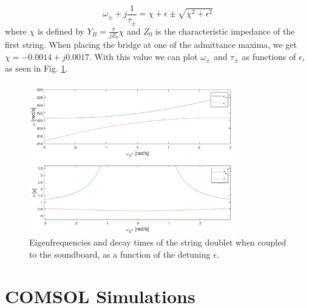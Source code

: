 \documentclass[a4paper]{article}
\begin{document}
$$ \omega_{\pm} + j \frac{1}{\tau_{\pm}} = \chi + \epsilon \pm \sqrt{\chi^2 + \epsilon^2}  $$
where $\chi$ is defined by $Y_B = \frac{\pi }{j Z_0}\chi$ and $Z_0$ is the characteristic impedance of the first string. When placing the bridge at one of the admittance maxima, we get $\chi = -0.0014 + j 0.0017$. With this value we can plot $\omega_{\pm}$ and $\tau_{\pm}$ as functions of $\epsilon$, as seen in Fig. \ref{fig:doub}.

\begin{figure}[h]
	\centering
	\includegraphics[width=0.8\textwidth]{doublet.png}
	\caption{Eigenfrequencies and decay times of the string doublet when coupled to the soundboard, as a function of the detuning $\epsilon$.}
	\label{fig:doub}
\end{figure}

\printbibliography

\appendix
\section{COMSOL Simulations}
\end{document}
